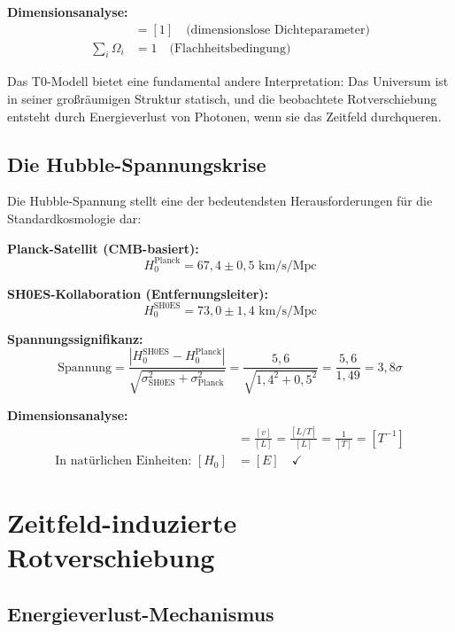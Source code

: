 \documentclass[12pt,a4paper]{report}
\begin{document}
	\textbf{Dimensionsanalyse:}
	\begin{align}
		[\Omega_i] &= [1] \quad \text{(dimensionslose Dichteparameter)} \\
		\sum_i \Omega_i &= 1 \quad \text{(Flachheitsbedingung)}
	\end{align}
	
	Das T0-Modell bietet eine fundamental andere Interpretation: Das Universum ist in seiner großräumigen Struktur statisch, und die beobachtete Rotverschiebung entsteht durch Energieverlust von Photonen, wenn sie das Zeitfeld durchqueren.
	
	\subsection{Die Hubble-Spannungskrise}
	\label{subsec:hubble_tension_crisis}
	
	Die Hubble-Spannung stellt eine der bedeutendsten Herausforderungen für die Standardkosmologie dar:
	
	\textbf{Planck-Satellit (CMB-basiert):}
	\begin{equation}
		H_0^{\text{Planck}} = 67,4 \pm 0,5 \text{ km/s/Mpc}
	\end{equation}
	
	\textbf{SH0ES-Kollaboration (Entfernungsleiter):}
	\begin{equation}
		H_0^{\text{SH0ES}} = 73,0 \pm 1,4 \text{ km/s/Mpc}
	\end{equation}
	
	\textbf{Spannungssignifikanz:}
	\begin{equation}
		\text{Spannung} = \frac{|H_0^{\text{SH0ES}} - H_0^{\text{Planck}}|}{\sqrt{\sigma_{\text{SH0ES}}^2 + \sigma_{\text{Planck}}^2}} = \frac{5,6}{\sqrt{1,4^2 + 0,5^2}} = \frac{5,6}{1,49} = 3,8\sigma
	\end{equation}
	
	\textbf{Dimensionsanalyse:}
	\begin{align}
		[H_0] &= \frac{[v]}{[L]} = \frac{[L/T]}{[L]} = \frac{1}{[T]} = [T^{-1}] \\
		\text{In natürlichen Einheiten: } [H_0] &= [E] \quad \checkmark
	\end{align}
	
	\section{Zeitfeld-induzierte Rotverschiebung}
	\label{sec:timefield_redshift}
	
	\subsection{Energieverlust-Mechanismus}
	\label{subsec:energy_loss_mechanism}
	
\end{document}
